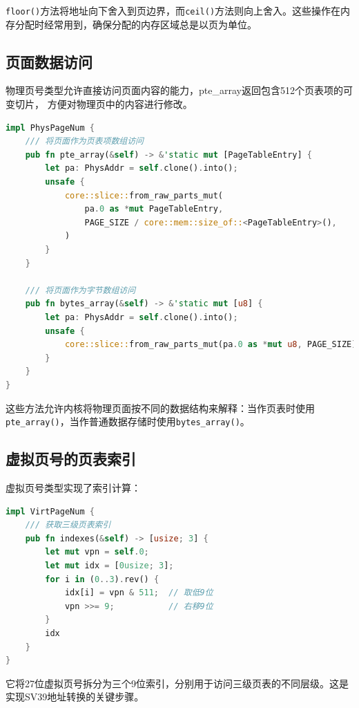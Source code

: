 \lstinline[language=Rust]{floor()}方法将地址向下舍入到页边界，而\lstinline[language=Rust]{ceil()}方法则向上舍入。这些操作在内存分配时经常用到，确保分配的内存区域总是以页为单位。

\subsection{页面数据访问}

物理页号类型允许直接访问页面内容的能力，pte\_array返回包含512个页表项的可变切片，
方便对物理页中的内容进行修改。

\begin{lstlisting}[language=Rust,caption={页面访问接口}, label={lst:page-access}]
impl PhysPageNum {
    /// 将页面作为页表项数组访问
    pub fn pte_array(&self) -> &'static mut [PageTableEntry] {
        let pa: PhysAddr = self.clone().into();
        unsafe {
            core::slice::from_raw_parts_mut(
                pa.0 as *mut PageTableEntry,
                PAGE_SIZE / core::mem::size_of::<PageTableEntry>(),
            )
        }
    }

    /// 将页面作为字节数组访问
    pub fn bytes_array(&self) -> &'static mut [u8] {
        let pa: PhysAddr = self.clone().into();
        unsafe { 
            core::slice::from_raw_parts_mut(pa.0 as *mut u8, PAGE_SIZE) 
        }
    }
}
\end{lstlisting}

这些方法允许内核将物理页面按不同的数据结构来解释：当作页表时使用\lstinline[language=Rust]{pte_array()}，当作普通数据存储时使用\lstinline[language=Rust]{bytes_array()}。

\subsection{虚拟页号的页表索引}

虚拟页号类型实现了索引计算：

\begin{lstlisting}[language=Rust,caption={页表索引计算}, label={lst:vpn-indexes}]
impl VirtPageNum {
    /// 获取三级页表索引
    pub fn indexes(&self) -> [usize; 3] {
        let mut vpn = self.0;
        let mut idx = [0usize; 3];
        for i in (0..3).rev() {
            idx[i] = vpn & 511;  // 取低9位
            vpn >>= 9;           // 右移9位
        }
        idx
    }
}
\end{lstlisting}

它将27位虚拟页号拆分为三个9位索引，分别用于访问三级页表的不同层级。这是实现SV39地址转换的关键步骤。

